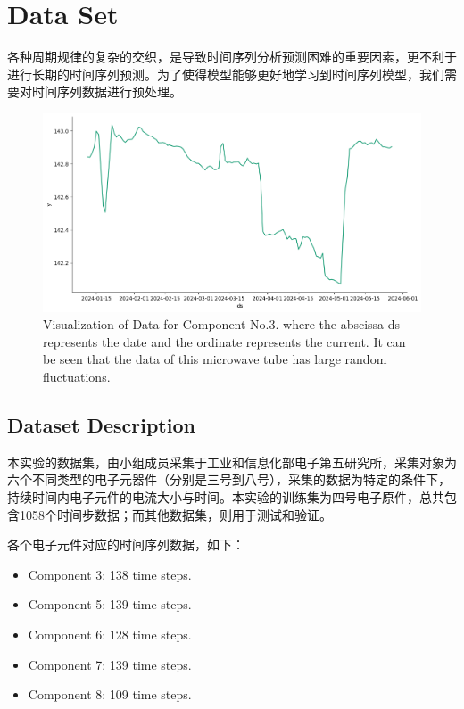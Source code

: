 \section{Data Set}
\label{sec:dataset}

各种周期规律的复杂的交织，是导致时间序列分析预测困难的重要因素，更不利于进行长期的时间序列预测。为了使得模型能够更好地学习到时间序列模型，我们需要对时间序列数据进行预处理。

\begin{figure}[H]
	\centering
	\includegraphics[width=\linewidth]{figures/No.3data} 
	
	
	
	\caption{Visualization of Data for Component No.3. where the abscissa ds represents the date and the ordinate represents the current. It can be seen that the data of this microwave tube has large random fluctuations.}
	\label{fig:No3_original}
\end{figure}


\subsection{Dataset Description}
本实验的数据集，由小组成员采集于工业和信息化部电子第五研究所，采集对象为六个不同类型的电子元器件（分别是三号到八号），采集的数据为特定的条件下，持续时间内电子元件的电流大小与时间。本实验的训练集为四号电子原件，总共包含1058个时间步数据；而其他数据集，则用于测试和验证。

各个电子元件对应的时间序列数据，如下：
\begin{itemize}
    \item Component 3: 138 time steps.
    \item Component 5: 139 time steps.
    \item Component 6: 128 time steps.
    \item Component 7: 139 time steps.
    \item Component 8: 109 time steps.
\end{itemize}

